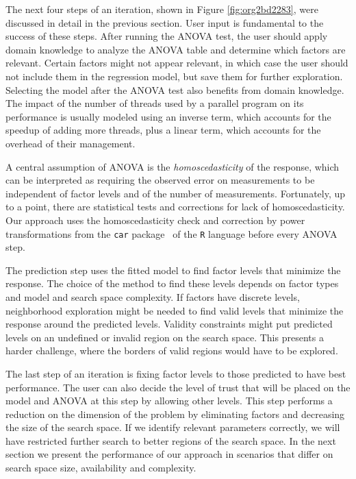 \documentclass[conference]{IEEEtran}
\begin{document}
The next four steps of an iteration, shown in Figure \ref{fig:org2bd2283},
were discussed in detail in the previous section. User input is fundamental to
the success of these steps. After running the ANOVA test, the user should apply
domain knowledge to analyze the ANOVA table and determine which factors are
relevant. Certain factors might not appear relevant, in which case the user
should not include them in the regression model, but save them for further
exploration. Selecting the model after the ANOVA test also benefits from domain
knowledge. The impact of the number of threads used by a parallel program on its
performance is usually modeled using an inverse term, which accounts for the
speedup of adding more threads, plus a linear term, which accounts for the
overhead of their management.

A central assumption of ANOVA is the \emph{homoscedasticity} of the response, which
can be interpreted as requiring the observed error on measurements to be
independent of factor levels and of the number of measurements. Fortunately, up
to a point, there are statistical tests and corrections for lack of
homoscedasticity. Our approach uses the homoscedasticity check and correction by
power transformations from the \texttt{car} package~\cite{fox2011car} of the \texttt{R}
language before every ANOVA step.

The prediction step uses the fitted model to find factor levels that minimize
the response. The choice of the method to find these levels depends on factor
types and model and search space complexity. If factors have discrete levels,
neighborhood exploration might be needed to find valid levels that minimize the
response around the predicted levels. Validity constraints might put predicted
levels on an undefined or invalid region on the search space. This presents a
harder challenge, where the borders of valid regions would have to be explored.

The last step of an iteration is fixing factor levels to those predicted to have
best performance. The user can also decide the level of trust that will be
placed on the model and ANOVA at this step by allowing other levels. This step
performs a reduction on the dimension of the problem by eliminating factors and
decreasing the size of the search space. If we identify relevant parameters
correctly, we will have restricted further search to better regions of the
search space. In the next section we present the performance of our approach in
scenarios that differ on search space size, availability and complexity.
\end{document}
